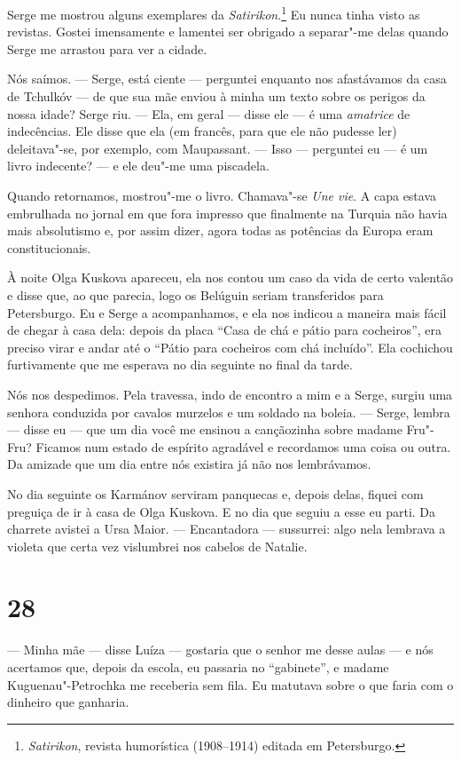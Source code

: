 Serge me mostrou alguns exemplares da \emph{Satirikon}.\footnote{\emph{Satirikon},
  revista humorística (1908--1914) editada em Petersburgo.} Eu nunca
tinha visto as revistas. Gostei imensamente e lamentei ser obrigado a
separar"-me delas quando Serge me arrastou para ver a cidade.

Nós saímos. --- Serge, está ciente --- perguntei enquanto nos
afastávamos da casa de Tchulkóv --- de que sua mãe enviou à minha um
texto sobre os perigos da nossa idade? Serge riu. --- Ela, em geral ---
disse ele --- é uma \emph{amatrice} de indecências. Ele disse que ela
(em francês, para que ele não pudesse ler) deleitava"-se, por exemplo,
com Maupassant. --- Isso --- perguntei eu --- é um livro indecente? ---
e ele deu"-me uma piscadela.

Quando retornamos, mostrou"-me o livro. Chamava"-se \emph{Une vie}. A capa
estava embrulhada no jornal em que fora impresso que finalmente na
Turquia não havia mais absolutismo e, por assim dizer, agora todas as
potências da Europa eram constitucionais.

À noite Olga Kuskova apareceu, ela nos contou um caso da vida de certo
valentão e disse que, ao que parecia, logo os Belúguin seriam
transferidos para Petersburgo. Eu e Serge a acompanhamos, e ela nos
indicou a maneira mais fácil de chegar à casa dela: depois da placa
``Casa de chá e pátio para cocheiros'', era preciso virar e andar até o
``Pátio para cocheiros com chá incluído''. Ela cochichou furtivamente
que me esperava no dia seguinte no final da tarde.

Nós nos despedimos. Pela travessa, indo de encontro a mim e a Serge,
surgiu uma senhora conduzida por cavalos murzelos e um soldado na
boleia. --- Serge, lembra --- disse eu --- que um dia você me ensinou a
cançãozinha sobre madame Fru"-Fru? Ficamos num estado de espírito
agradável e recordamos uma coisa ou outra. Da amizade que um dia entre
nós existira já não nos lembrávamos.

No dia seguinte os Karmánov serviram panquecas e, depois delas, fiquei
com preguiça de ir à casa de Olga Kuskova. E no dia que seguiu a esse eu
parti. Da charrete avistei a Ursa Maior. --- Encantadora --- sussurrei:
algo nela lembrava a violeta que certa vez vislumbrei nos cabelos de
Natalie.

\section{28}

--- Minha mãe --- disse Luíza --- gostaria que o senhor me desse aulas
--- e nós acertamos que, depois da escola, eu passaria no ``gabinete'',
e madame Kuguenau"-Petrochka me receberia sem fila. Eu matutava sobre o
que faria com o dinheiro que ganharia.

